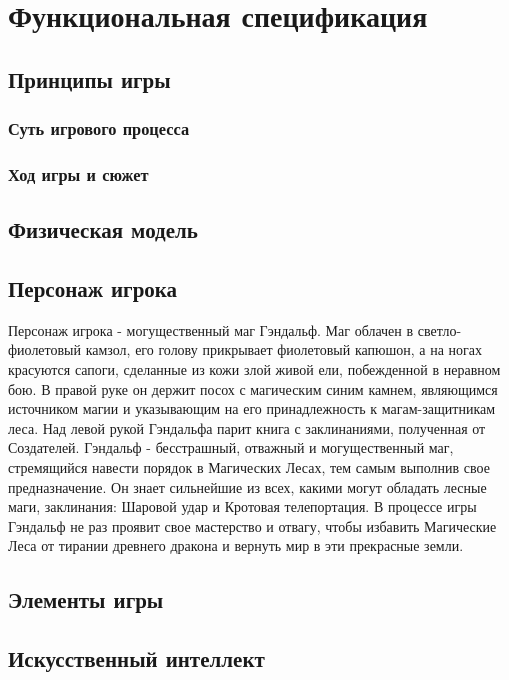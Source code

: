 \documentclass{article}
\begin{document}
\newpage
\section{Функциональная спецификация}
\subsection{Принципы игры}
\subsubsection{Суть игрового процесса}

\subsubsection{Ход игры и сюжет}

\subsection{Физическая модель}

\subsection{Персонаж игрока}
Персонаж игрока - могущественный маг Гэндальф. 
Маг облачен в светло-фиолетовый камзол, его голову прикрывает фиолетовый капюшон, а на ногах красуются сапоги, сделанные из кожи злой живой ели, побежденной в неравном бою. 
В правой руке он держит посох с магическим синим камнем, являющимся источником магии и указывающим на его принадлежность к магам-защитникам леса. 
Над левой рукой Гэндальфа парит книга с заклинаниями, полученная от Создателей. Гэндальф - бесстрашный, отважный  и могущественный маг, стремящийся навести порядок в Магических Лесах, тем самым выполнив свое предназначение. 
Он знает сильнейшие из всех, какими могут обладать лесные маги, заклинания: Шаровой удар и Кротовая телепортация.  
В процессе игры Гэндальф не раз проявит свое мастерство и отвагу, чтобы избавить Магические Леса от тирании древнего дракона и вернуть мир в эти прекрасные земли.  

\subsection{Элементы игры}

\subsection{Искусственный интеллект}
\end{document}
